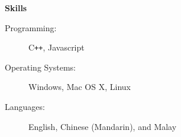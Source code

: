 \documentclass[letterpaper,11pt]{article}
\newcommand{\resheading}[1]{{\begin{mdframed}[backgroundcolor=mygray]{\large \textbf{#1}}\end{mdframed}}}
\begin{document}

\resheading{Skills}

\begin{description}
\item[Programming:]
C\verb!++!, Javascript
\item[Operating Systems:]
Windows, Mac OS X, Linux
\item[Languages:]
English, Chinese (Mandarin), and Malay
\end{description}
\end{document}
